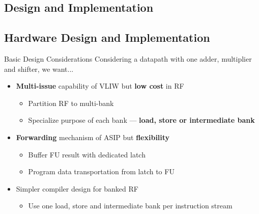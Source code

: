 \documentclass{beamer}
\begin{document}
\begin{CJK}{UTF8}{bkai}


            \section{Design and Implementation}

            \subsection{Hardware Design and Implementation}
            \begin{frame}{Basic Design Considerations}
                Considering a datapath with one adder, multiplier and shifter, we want... \\
                \begin{itemize}
                    \item \textbf{Multi-issue} capability of VLIW but \textbf{low cost} in RF
                        \begin{itemize}
                            \item Partition RF to multi-bank
                            \item Specialize purpose of each bank --- \textbf{load, store or intermediate bank}
                        \end{itemize}
                    \item \textbf{Forwarding} mechanism of ASIP but \textbf{flexibility}
                        \begin{itemize}
                            \item Buffer FU result with dedicated latch
                            \item Program data transportation from latch to FU
                        \end{itemize}
                    \item Simpler compiler design for banked RF
                        \begin{itemize}
                            \item Use one load, store and intermediate bank per instruction stream 

\end{itemize}
\end{itemize}
\end{frame}
\end{CJK}
\end{document}

